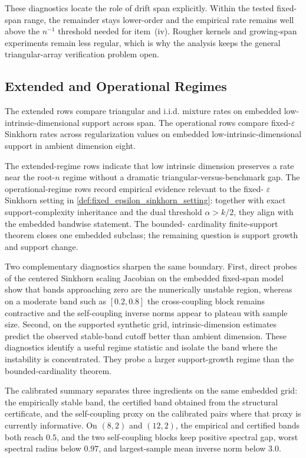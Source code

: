 These diagnostics locate the role of drift span explicitly. Within the tested
fixed-span range, the remainder stays lower-order and the empirical rate remains
well above the $n^{-1}$ threshold needed for item~(iv). Rougher kernels and
growing-span experiments remain less regular, which is why the analysis keeps
the general triangular-array verification problem open.

\subsection{Extended and Operational Regimes}

The extended rows compare triangular and i.i.d. mixture rates on embedded
low-intrinsic-dimensional support across span. The operational rows compare
fixed-$\varepsilon$ Sinkhorn rates across regularization values on embedded
low-intrinsic-dimensional support in ambient dimension eight.



The extended-regime rows indicate that low intrinsic dimension preserves a rate
near the root-$n$ regime without a dramatic triangular-versus-benchmark gap. The
operational-regime rows record empirical evidence relevant to the fixed-
$\varepsilon$ Sinkhorn setting in \cref{def:fixed_epsilon_sinkhorn_setting}:
together with exact support-complexity inheritance and the dual threshold
$\alpha>k/2$, they align with the embedded bandwise statement. The bounded-
cardinality finite-support theorem closes one embedded subclass; the remaining
question is support growth and support change.

Two complementary diagnostics sharpen the same boundary. First, direct probes of
the centered Sinkhorn scaling Jacobian on the embedded fixed-span model show
that bands approaching zero are the numerically unstable region, whereas on a
moderate band such as $[0.2,0.8]$ the cross-coupling block remains contractive
and the self-coupling inverse norms appear to plateau with sample size. Second,
on the supported synthetic grid, intrinsic-dimension estimates
predict the observed stable-band cutoff better than ambient dimension.
These diagnostics identify a useful regime statistic and isolate the band where
the instability is concentrated. They probe a larger support-growth regime than
the bounded-cardinality theorem.

The calibrated summary separates three ingredients on the same embedded grid:
the empirically stable band, the certified band obtained from the structural
certificate, and the self-coupling proxy on the calibrated pairs where that
proxy is currently informative. On $(8,2)$ and $(12,2)$, the empirical and
certified bands both reach $0.5$, and the two self-coupling blocks keep
positive spectral gap, worst spectral radius below $0.97$, and largest-sample
mean inverse norm below $3.0$.

